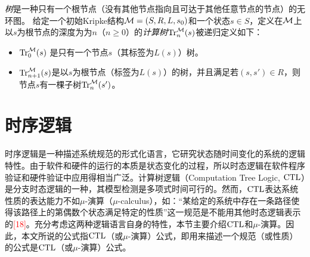 \emph{树}是一种只有一个根节点（没有其他节点指向且可达于其他任意节点的节点）的无环图。
给定一个初始Kripke结构${\cal M}=(S,R,L,s_0)$和一个状态$s\in S$，定义在${\cal M}$上以$s$为根节点的深度为为$n$（$n\ge 0$）的\emph{计算树}$\textrm{Tr}_n^{{\cal M}}(s)$被递归定义如下\cite{browne1988characterizing}：
\begin{itemize}
	\item $\textrm{Tr}_0^{{\cal M}}(s)$ 是只有一个节点$s$（其标签为$L(s)$）树。
	\item $\textrm{Tr}_{n+1}^{{\cal M}}(s)$是以$s$为根节点（标签为$L(s)$）的树，并且满足若$(s,s')\in R$，则节点$s$有一棵子树$\textrm{Tr}_{n}^{{\cal M}}(s')$。
\end{itemize}




\section{时序逻辑}
时序逻辑是一种描述系统规范的形式化语言，它研究状态随时间变化的系统的逻辑特性。由于软件和硬件的运行的本质是状态变化的过程，所以时态逻辑在软件程序验证和硬件验证中应用得相当广泛。计算树逻辑（Computation Tree Logic, $\textrm{CTL}$）是分支时态逻辑的一种，其模型检测是多项式时间可行的。然而，$\textrm{CTL}$表达系统性质的表达能力不如$\mu$-演算（$\mu$-calculus），如：“某给定的系统中存在一条路径使得该路径上的第偶数个状态满足特定的性质”这一规范是不能用其他时态逻辑表示的\textcolor{red}{[18]}。充分考虑这两种逻辑语言自身的特性，本节主要介绍$\textrm{CTL}$和$\mu$-演算。因此，本文所说的公式指$\textrm{CTL}$（或$\mu$-演算）公式，即用来描述一个规范（或性质）的公式是$\textrm{CTL}$（或$\mu$-演算）公式。

